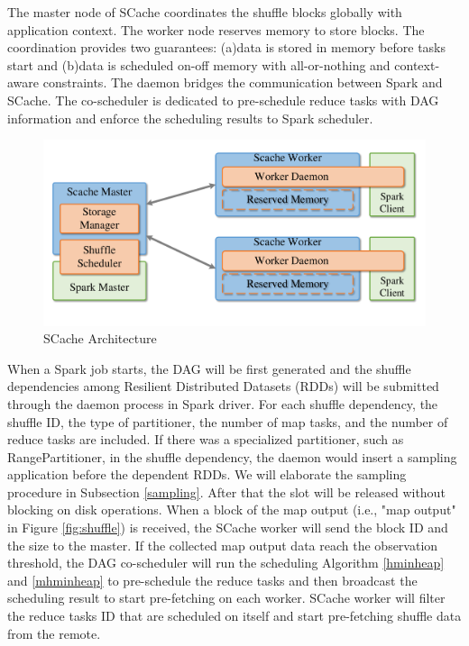 The master node of SCache coordinates the shuffle blocks globally with application context. The worker node reserves memory to store blocks.
The coordination provides two guarantees: (a)data is stored in memory before tasks start and (b)data is scheduled on-off memory with all-or-nothing and context-aware constraints. 
The daemon bridges the communication between Spark and SCache. The co-scheduler is dedicated to pre-schedule reduce tasks with DAG information and enforce the scheduling results to Spark scheduler.
\begin{figure}
	\centering
	\includegraphics[width=0.8\linewidth]{fig/arch}
	\caption{SCache Architecture}
	\label{fig:arch}
	\vspace{-1em}
\end{figure}
When a Spark job starts, the DAG will be first generated and the shuffle dependencies among Resilient Distributed Datasets (RDDs) will be submitted through the daemon process in Spark driver. 
For each shuffle dependency, the shuffle ID, the type of partitioner, the number of map tasks, and the number of reduce tasks are included. 
If there was a specialized partitioner, such as RangePartitioner, in the shuffle dependency, the daemon would insert a sampling application before the dependent RDDs. 
We will elaborate the sampling procedure in Subsection \ref{sampling}.
After that the slot will be released without blocking on disk operations.
When a block of the map output (i.e., "map output" in Figure \ref{fig:shuffle}) is received, the SCache worker will send the block ID and the size to the master.
If the collected map output data reach the observation threshold, the DAG co-scheduler will run the scheduling Algorithm \ref{hminheap} and \ref{mhminheap} to pre-schedule the reduce tasks and then broadcast the scheduling result to start pre-fetching on each worker.
SCache worker will filter the reduce tasks ID that are scheduled on itself and start pre-fetching shuffle data from the remote. 

